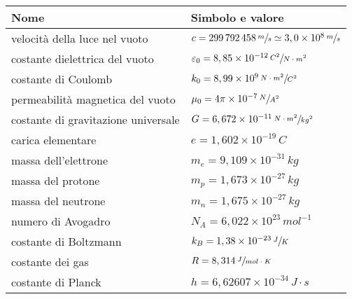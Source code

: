 \documentclass[a4paper,11pt,italian]{article}
\begin{document}
\begin{description}
  \begin{table}[h]\centering
    \begin{tabular}{ll}\toprule
      \textbf{Nome} & \textbf{Simbolo e valore}\\\midrule
      velocità della luce nel vuoto & $ c = 299\,  792\, 458\,	\sfrac{m}{s} \simeq 3,0 \times 10^8 \,	\sfrac{m}{s} $ \\\addlinespace[.2em]
      costante dielettrica del vuoto & $ \varepsilon_0 = 8,85\times 10^{-12} \, \sfrac{C^2}{N \cdot m^2} $ \\\addlinespace[.2em]
      costante di Coulomb & $ k_0 = 8,99 \times 10^9 \, \sfrac{N \cdot m^2}{C^2} $ \\\addlinespace[.2em]
      permeabilità magnetica del vuoto & $ \mu_0 = 4\pi \times 10^{-7} \, \sfrac{N}{A^2} $ \\\addlinespace[.2em]
      costante di gravitazione universale & $ G = 6,672 \times 10^{-11} \, \sfrac{N \cdot m^2}{kg^2} $ \\\addlinespace[.2em]
      carica elementare & $ e = 1,602 \times 10^{-19} \, C $ \\\addlinespace[.2em]
      massa dell'elettrone & $ m_e = 9,109 \times 10^{-31} \, kg $ \\\addlinespace[.2em]
      massa del protone & $ m_p = 1,673 \times 10^{-27} \, kg $ \\\addlinespace[.2em]
      massa del neutrone & $ m_n = 1,675 \times 10^{-27} \, kg $ \\\addlinespace[.2em]
      numero di Avogadro & $ N_A = 6,022 \times 10^{23} \, mol^{-1} $ \\\addlinespace[.2em]
      costante di Boltzmann & $ k_B = 1,38 \times 10^{-23} \, \sfrac{J}{K} $ \\\addlinespace[.2em]
      costante dei gas & $ R = 8,314 \, \sfrac{J}{mol \cdot K} $ \\\addlinespace[.2em]
      costante di Planck & $ h = 6,62607 \times 10^{-34} \, J\cdot s $ \\\bottomrule
    \end{tabular}
  \end{table}  


\end{description}
\end{document}
